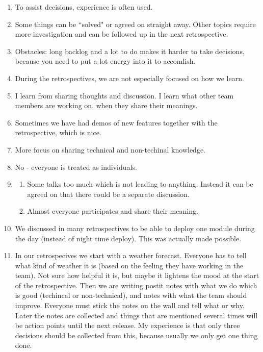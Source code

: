 \begin{enumerate}
\item To assist decisions, experience is often used.
\item Some things can be ``solved" or agreed on straight away. Other topics require more investigation and can be followed up in the next retrospective.
\item Obstacles: long backlog and a lot to do makes it harder to take decisions, because you need to put a lot energy into it to accomlish.
\item During the retrospectives, we are not especially focused on how we learn.
\item I learn from sharing thoughts and discussion. I learn what other team members are working on, when they share their meanings.
\item Sometimes we have had demos of new features together with the retrospective, which is nice.
\item More focus on sharing technical and non-techinal knowledge.
\item No - everyone is treated as individuals.
\item \begin{enumerate}
	\item Some talks too much which is not leading to anything. Instead it can be agreed on that there could be a separate discussion.
	\item Almost everyone participates and share their meaning.
\end{enumerate}
\item We discussed in many retrospectives to be able to deploy one module during the day (instead of night time deploy). This was actually made possible.
\item In our retrospecives we start with a weather forecast. Everyone has to tell what kind of weather it is (based on the feeling they have working in the team). Not sure how helpful it is, but maybe it lightens the mood at the start of the retrospective. Then we are writing postit notes with what we do which is good (techincal or non-technical), and notes with what the team should improve. Everyone must stick the notes on the wall and tell what or why. Later the notes are collected and things that are mentioned several times will be action points until the next release. My experience is that only three decisions should be collected from this, because usually we only get one thing done.
\end{enumerate}

